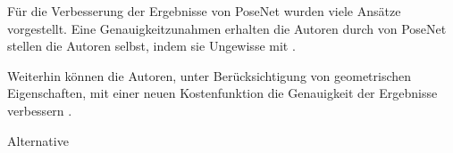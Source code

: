 Für die Verbesserung der Ergebnisse von PoseNet wurden viele Ansätze vorgestellt. Eine Genauigkeitzunahmen erhalten die Autoren durch  von PoseNet stellen die Autoren selbst, indem sie Ungewisse mit .

Weiterhin können die Autoren, unter Berücksichtigung von geometrischen Eigenschaften, mit einer neuen Kostenfunktion die Genauigkeit der Ergebnisse verbessern \cite{kendallGeometricLossFunctions2017}.

Alternative 





% 
